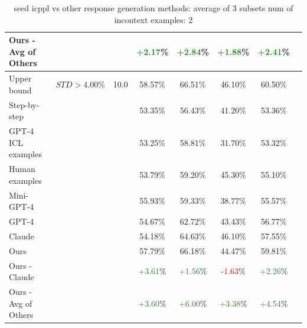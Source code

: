 \begin{table}[t!]
{\begin{tabular}{l|l|c|c|c|c|c|c}
    Ours - Avg of Others  &   &   & \textcolor{ForestGreen}{+2.17}\% & \textcolor{ForestGreen}{+2.84}\% & \textcolor{ForestGreen}{+1.88}\% & \textcolor{ForestGreen}{+2.41}\% \\
    \hline
    Upper bound  & $STD > 4.00\%$ & 10.0 & 58.57\% & 66.51\% & 46.10\% & 60.50\% \\
    Step-by-step  &   &   & 53.35\% & 56.43\% & 41.20\% & 53.36\% \\
    GPT-4 ICL examples  &   &   & 53.25\% & 58.81\% & 31.70\% & 53.32\% \\
    Human examples  &   &   & 53.79\% & 59.20\% & 45.30\% & 55.10\% \\
    Mini-GPT-4  &   &   & 55.93\% & 59.33\% & 38.77\% & 55.57\% \\
    GPT-4  &   &   & 54.67\% & 62.72\% & 43.43\% & 56.77\% \\
    Claude  &   &   & 54.18\% & 64.63\% & 46.10\% & 57.55\% \\
    Ours  &   &   & 57.79\% & 66.18\% & 44.47\% & 59.81\% \\
    \hline
    Ours - Claude  &   &   & \textcolor{ForestGreen}{+3.61}\% & \textcolor{ForestGreen}{+1.56}\% & \textcolor{red}{-1.63}\% & \textcolor{ForestGreen}{+2.26}\% \\
    Ours - Avg of Others  &   &   & \textcolor{ForestGreen}{+3.60}\% & \textcolor{ForestGreen}{+6.00}\% & \textcolor{ForestGreen}{+3.38}\% & \textcolor{ForestGreen}{+4.54}\% \\
    \hline
  \end{tabular}}
  \caption{seed icppl vs other response generation methods: average of 3 subsets  num of incontext examples: 2}
  \label{tab:icppl vs other response generation methods: average of 3 subsets  num of incontext examples: 2}
\end{table}
